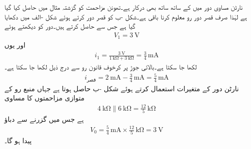 نارٹن مساوی دور میں  کے ساتھ ساتھ  بھی درکار ہے۔تھونن مزاحمت کو گزشتہ مثال میں حاصل کیا گیا ہے لہٰذا صرف قصر دور رو معلوم کرنا باقی ہے۔شکل -ب کو قصر دور کرتے ہوئے شکل -الف میں دکھایا گیا ہے جس سے   حاصل کرتے ہیں۔دور کو دیکھتے ہوئے 
\begin{align*}
V_1=\SI{3}{\volt}
\end{align*}
اور یوں
\begin{align*}
i_1=\frac{\SI{3}{\volt}}{\SI{1}{\kilo\ohm}+\SI{3}{\kilo\ohm}}=\frac{3}{4} \, \si{\milli\ampere}
\end{align*}
لکھا جا سکتا ہے۔بالائی جوڑ  پر کرخوف قانون رو سے درج ذیل لکھا جا سکتا ہے۔
\begin{align*}
i_{\text{قصر}} = \SI{2}{\milli\ampere}-\frac{3}{4} \, \si{\milli\ampere}=\frac{5}{4} \, \si{\milli\ampere}
\end{align*}
نارٹن دور کے متغیرات  استعمال کرتے ہوئے شکل -ب حاصل ہوتا ہے جہاں منبع رو کے متوازی مزاحمتوں کا مساوی
\begin{align*}
\SI{4}{\kilo\ohm} \parallel \SI{6}{\kilo\ohm}=\frac{12}{5} \, \si{\kilo\ohm}
\end{align*}
ہے  جس میں  گزرنے سے دباؤ
\begin{align*}
V_0=\frac{5}{4} \, \si{\milli\ampere} \times \frac{12}{5} \, \si{\kilo\ohm}=\SI{3}{\volt}
\end{align*}
پیدا ہو گا۔

